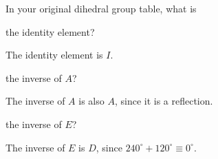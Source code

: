 \documentclass[../key.tex]{subfiles}
\begin{document}
\begin{outer_problem}
\item In your original dihedral group table, what is
\end{outer_problem}

\begin{inner_problem}[start=1]
\item the identity element?
\end{inner_problem}

\noindent The identity element is $I$.

\begin{inner_problem}
\item the inverse of $A$?
\end{inner_problem}

\noindent The inverse of $A$ is also $A$, since it is a reflection.

\begin{inner_problem}
\item the inverse of $E$?
\end{inner_problem}

\noindent The inverse of $E$ is $D$, since $240^\circ+120^\circ\equiv 0^\circ$.
\end{document}
